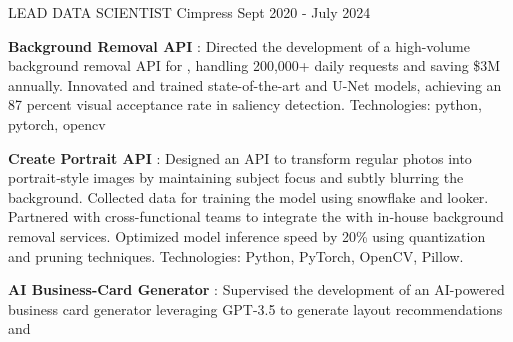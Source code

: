 
\begin{cventries}

    \cventry
    {LEAD DATA SCIENTIST} %
    {Cimpress} %
    {} %
    {Sept 2020 - July 2024} %
    {
      \begin{cvitems} %
      \item{\textbf{Background Removal API} : \newline 
      Directed the development of a high-volume background removal API for ,  
      handling 200,000+ daily requests and saving \$3M annually. \newline 
      Innovated and trained state-of-the-art  and 
      U-Net models, achieving an 87 percent visual acceptance rate in saliency 
      detection. \newline 
      Technologies: python, pytorch, opencv }
      \item{\textbf{Create Portrait API} : \newline
      Designed an API to transform regular photos into portrait‐style images by maintaining subject focus and subtly blurring the background.
      \newline
      Collected data for training the model using snowflake and looker. 
      \newline 
      Partnered with cross-functional teams to integrate the  with in‐house background removal services.
      \newline
      Optimized model inference speed by 20\% using quantization and pruning techniques.
      Technologies: Python, PyTorch, OpenCV, Pillow. }
      \item{\textbf{AI Business-Card Generator} : \newline
      Supervised the development of an AI-powered business card generator leveraging GPT-3.5 to generate layout recommendations and 
}
\end{cvitems}}
\end{cventries}
